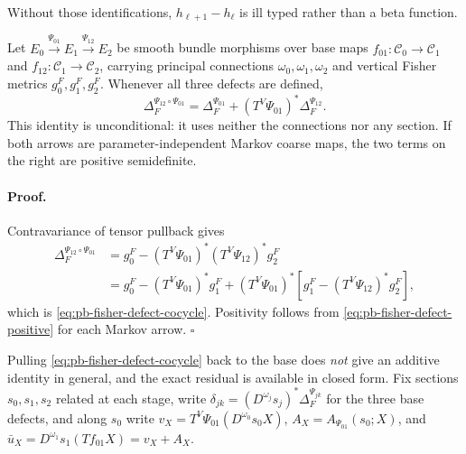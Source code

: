 Without those identifications, $h_{\ell+1}-h_\ell$ is ill typed rather than a
beta function. 

Let
$E_0\xrightarrow{\Psi_{01}}E_1\xrightarrow{\Psi_{12}}E_2$ be smooth bundle
morphisms over base maps $f_{01}:\mathcal C_0\to\mathcal C_1$ and
$f_{12}:\mathcal C_1\to\mathcal C_2$, carrying principal connections
$\omega_0,\omega_1,\omega_2$ and vertical Fisher metrics
$g_0^F,g_1^F,g_2^F$.  Whenever all three defects are defined,
\begin{equation}
\Delta_F^{\Psi_{12}\circ\Psi_{01}}
=\Delta_F^{\Psi_{01}}
+(T^V\Psi_{01})^*\Delta_F^{\Psi_{12}}.
\label{eq:pb-fisher-defect-cocycle}
\end{equation}
This identity is unconditional: it uses neither the connections nor any
section.  If both arrows are parameter-independent Markov coarse maps, the two
terms on the right are positive semidefinite.  

\paragraph{Proof.}
Contravariance of tensor pullback gives
\begin{align*}
\Delta_F^{\Psi_{12}\circ\Psi_{01}}
&=g_0^F-(T^V\Psi_{01})^*(T^V\Psi_{12})^*g_2^F\\
&=g_0^F-(T^V\Psi_{01})^*g_1^F
+(T^V\Psi_{01})^*
\left[g_1^F-(T^V\Psi_{12})^*g_2^F\right],
\end{align*}
which is \eqref{eq:pb-fisher-defect-cocycle}.  Positivity follows from
\eqref{eq:pb-fisher-defect-positive} for each Markov arrow.  $\square$

Pulling \eqref{eq:pb-fisher-defect-cocycle} back to the base does \emph{not}
give an additive identity in general, and the exact residual is available in
closed form.  Fix sections $s_0,s_1,s_2$ related at each stage, write
$\delta_{jk}=(D^{\omega_j}s_j)^*\Delta_F^{\Psi_{jk}}$ for the three base
defects, and along $s_0$ write
$v_X=T^V\Psi_{01}(D^{\omega_0}s_0X)$, $A_X=A_{\Psi_{01}}(s_0;X)$, and
$\bar u_X=D^{\omega_1}s_1(Tf_{01}X)=v_X+A_X$.

